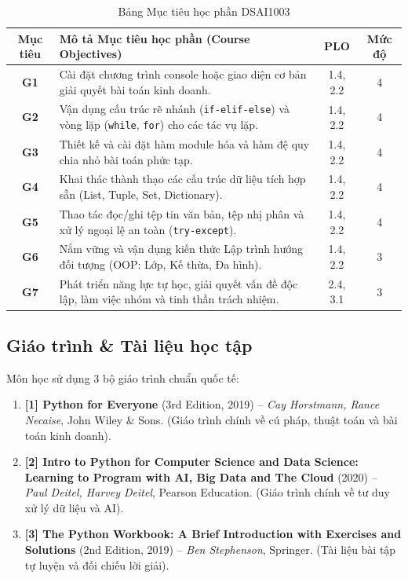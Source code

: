 \documentclass[11pt,a4paper]{article}
\begin{document}
\begin{table}[htbp]
\centering
\small
\begin{tabularx}{\textwidth}{@{}c X c c@{}}
\toprule
\textbf{Mục tiêu} & \textbf{Mô tả Mục tiêu học phần (Course Objectives)} & \textbf{PLO} & \textbf{Mức độ} \\
\midrule
\textbf{G1} & Cài đặt chương trình console hoặc giao diện cơ bản giải quyết bài toán kinh doanh. & 1.4, 2.2 & 4 \\
\textbf{G2} & Vận dụng cấu trúc rẽ nhánh (\texttt{if-elif-else}) và vòng lặp (\texttt{while}, \texttt{for}) cho các tác vụ lặp. & 1.4, 2.2 & 4 \\
\textbf{G3} & Thiết kế và cài đặt hàm module hóa và hàm đệ quy chia nhỏ bài toán phức tạp. & 1.4, 2.2 & 4 \\
\textbf{G4} & Khai thác thành thạo các cấu trúc dữ liệu tích hợp sẵn (List, Tuple, Set, Dictionary). & 1.4, 2.2 & 4 \\
\textbf{G5} & Thao tác đọc/ghi tệp tin văn bản, tệp nhị phân và xử lý ngoại lệ an toàn (\texttt{try-except}). & 1.4, 2.2 & 4 \\
\textbf{G6} & Nắm vững và vận dụng kiến thức Lập trình hướng đối tượng (OOP: Lớp, Kế thừa, Đa hình). & 1.4, 2.2 & 3 \\
\textbf{G7} & Phát triển năng lực tự học, giải quyết vấn đề độc lập, làm việc nhóm và tinh thần trách nhiệm. & 2.4, 3.1 & 3 \\
\bottomrule
\end{tabularx}
\caption{Bảng Mục tiêu học phần DSAI1003}
\end{table}

\subsection{Giáo trình \& Tài liệu học tập}
Môn học sử dụng 3 bộ giáo trình chuẩn quốc tế:
\begin{enumerate}[leftmargin=1.5em, itemsep=3pt]
    \item \textbf{[1] Python for Everyone} (3rd Edition, 2019) -- \textit{Cay Horstmann, Rance Necaise}, John Wiley \& Sons. (Giáo trình chính về cú pháp, thuật toán và bài toán kinh doanh).
    \item \textbf{[2] Intro to Python for Computer Science and Data Science: Learning to Program with AI, Big Data and The Cloud} (2020) -- \textit{Paul Deitel, Harvey Deitel}, Pearson Education. (Giáo trình chính về tư duy xử lý dữ liệu và AI).
    \item \textbf{[3] The Python Workbook: A Brief Introduction with Exercises and Solutions} (2nd Edition, 2019) -- \textit{Ben Stephenson}, Springer. (Tài liệu bài tập tự luyện và đối chiếu lời giải).
\end{enumerate}
\end{document}
